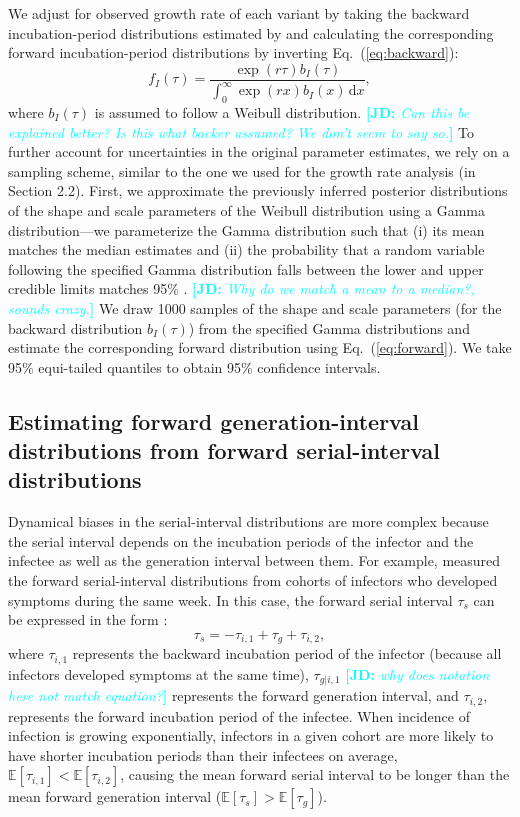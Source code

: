 \documentclass[12pt]{article}
\newcommand{\comment}{\showcomment}
\newcommand{\showcomment}[3]{\textcolor{#1}{\textbf{[#2: }\textsl{#3}\textbf{]}}}
\newcommand{\jd}[1]{\comment{cyan}{JD}{#1}}
\newcommand{\eref}[1]{Eq.~(\ref{eq:#1})}
\newcommand{\dd}[1]{\ensuremath{\, \mathrm{d}#1}}
\newcommand{\dx}{\dd{x}}
\begin{document}
We adjust for observed growth rate of each variant by taking the backward incubation-period distributions estimated by \cite{backer2021omicron} and calculating the corresponding forward incubation-period distributions by inverting \eref{backward}:
\begin{equation}
f_I(\tau) = \frac{\exp(r\tau) b_I(\tau) }{\int_0^\infty \exp(rx)  b_I(x)\dx},
\label{eq:forward}
\end{equation}
where $b_I(\tau)$ is assumed to follow a Weibull distribution.
\jd{Can this be explained better? Is this what backer assumed? We don't seem to say so.}
To further account for uncertainties in the original parameter estimates, we rely on a sampling scheme, similar to the one we used for the growth rate analysis (in Section 2.2).
First, we approximate the previously inferred posterior distributions of the shape and scale parameters of the Weibull distribution using a Gamma distribution---we parameterize the Gamma distribution such that (i) its mean matches the median estimates and (ii) the probability that a random variable following the specified Gamma distribution falls between the lower and upper credible limits matches 95\% \citep{park2020reconciling}.
\jd{Why do we match a mean to a median?, sounds crazy.}
We draw 1000 samples of the shape and scale parameters (for the backward distribution $b_I(\tau)$) from the specified Gamma distributions and estimate the corresponding forward distribution using \eref{forward}.
We take 95\% equi-tailed quantiles to obtain 95\% confidence intervals. 

\subsection{Estimating forward generation-interval distributions from forward serial-interval distributions}

Dynamical biases in the serial-interval distributions are more complex because the serial interval depends on the incubation periods of the infector and the infectee as well as the generation interval between them.
For example, \cite{backer2021omicron} measured the forward serial-interval distributions from cohorts of infectors who developed symptoms during the same week.
In this case, the forward serial interval $\tau_s$ can be expressed in the form \citep{park2021forward}:
\begin{equation}
\tau_s =  - \tau_{i, 1} + \tau_{g} + \tau_{i, 2},
\label{eq:serial}
\end{equation}
where $\tau_{i, 1}$ represents the backward incubation period of the infector (because all infectors developed symptoms at the same time), $\tau_{g|i,1}$ \jd{why does notation here not match equation?} represents the forward generation interval, and $\tau_{i, 2},$ represents the forward incubation period of the infectee.
When incidence of infection is growing exponentially, infectors in a given cohort are more likely to have shorter incubation periods than their infectees on average, $\mathbb E[\tau_{i, 1}] < \mathbb E[\tau_{i, 2}]$, causing the mean forward serial interval to be longer than the mean forward generation interval ($\mathbb E[\tau_s] > \mathbb E[\tau_{g}]$).
\end{document}
